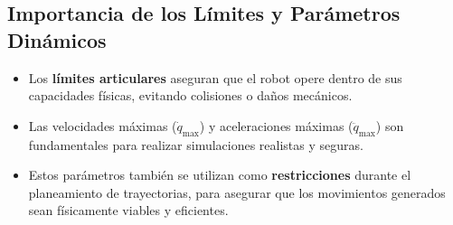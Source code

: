 \subsection{Importancia de los Límites y Parámetros Dinámicos}

\begin{itemize}
	\item Los \textbf{límites articulares} aseguran que el robot opere dentro de sus capacidades físicas, evitando colisiones o daños mecánicos.
	\item Las velocidades máximas ($\dot{q}_{\text{max}}$) y aceleraciones máximas ($\ddot{q}_{\text{max}}$) son fundamentales para realizar simulaciones realistas y seguras.
	\item Estos parámetros también se utilizan como \textbf{restricciones} durante el planeamiento de trayectorias, para asegurar que los movimientos generados sean físicamente viables y eficientes.
\end{itemize}

